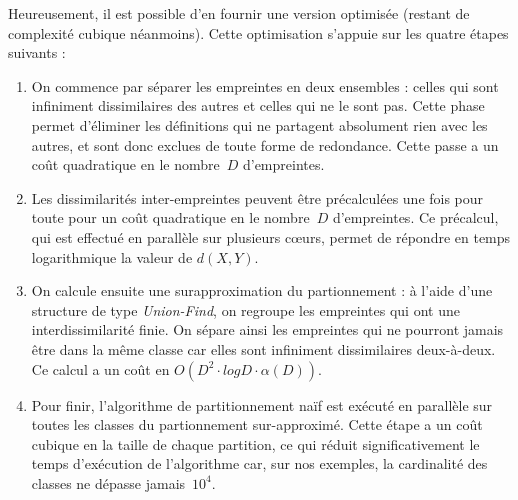 Heureusement, il est possible d'en fournir une version optimisée
(restant de complexité cubique néanmoins). Cette optimisation
s'appuie sur les quatre étapes suivants :

\begin{enumerate}
\item
  On commence par séparer les empreintes en deux ensembles : celles
  qui sont infiniment dissimilaires des autres et celles qui ne le
  sont pas. Cette phase permet d'éliminer les définitions qui ne
  partagent absolument rien avec les autres, et sont donc exclues de
  toute forme de redondance. Cette passe a un coût quadratique en le
  nombre~$D$ d'empreintes.
\item
  Les dissimilarités inter-empreintes peuvent être précalculées une
  fois pour toute pour un coût quadratique en le nombre~$D$
  d'empreintes.  Ce précalcul, qui est effectué en parallèle sur
  plusieurs c{\oe}urs, permet de répondre en temps logarithmique
  la valeur de $d(X, Y)$.
\item
  On calcule ensuite une surapproximation du partionnement : à l'aide
  d'une structure de type \textit{Union-Find}, on regroupe les
  empreintes qui ont une interdissimilarité finie. On sépare ainsi
  les empreintes qui ne pourront jamais être dans la même classe car
  elles sont infiniment dissimilaires deux-à-deux. Ce calcul a un coût
  en $O(D^2 \cdot log D \cdot \alpha(D))$. 
\item
  Pour finir, l'algorithme de partitionnement naïf est exécuté en
  parallèle sur toutes les classes du partionnement sur-approximé.
  Cette étape a un coût cubique en la taille de chaque partition, ce
  qui réduit significativement le temps d'exécution de l'algorithme
  car, sur nos exemples, la cardinalité des classes ne dépasse
  jamais~$10^4$.

\end{enumerate}
